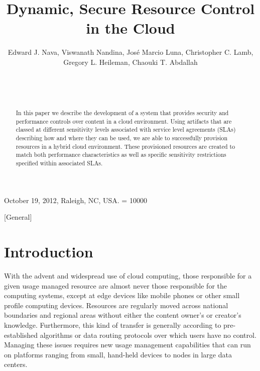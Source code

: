 \documentclass{acm_proc_article-sp}
\begin{document}
\title{Dynamic, Secure Resource Control in the Cloud}


\author{
\alignauthor
Edward J. Nava, Viswanath Nandina, Jos\'e Marcio Luna, Christopher C. Lamb, Gregory L. Heileman, Chaouki T. Abdallah\\
       \\
       \\
       \\
}

 {October 19, 2012, Raleigh, NC, USA.} 
\widowpenalty = 10000

\maketitle

\begin{abstract}
In this paper we describe the development of a system that provides security and performance controls over content in a cloud environment.  Using artifacts that are classed at different sensitivity levels associated with service level agreements (SLAs) describing how and where they can be used, we are able to successfully provision resources in a hybrid cloud environment.  These provisioned resources are created to match both performance characteristics as well as specific sensitivity restrictions specified within associated SLAs.
\end{abstract}

[General]

\section{Introduction}\label{sec:introduction}
With the advent and widespread use of cloud computing, those responsible for a given usage managed resource are almost never those responsible for the computing systems, except at edge devices like mobile phones or other small profile computing devices.  Resources are regularly moved across national boundaries and regional areas without either the content owner's or creator's knowledge.  Furthermore, this kind of transfer is generally according to pre-established algorithms or data routing protocols over which users have no control.  Managing these issues requires new usage management capabilities that can run on platforms ranging from small, hand-held devices to nodes in large data centers.
\end{document}
